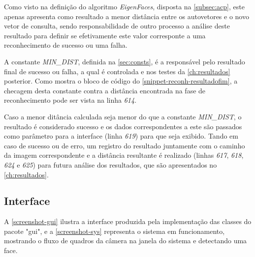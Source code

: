 Como visto na definição do algoritmo \textit{EigenFaces}, disposta na \autoref{subsec:acp}, este apenas apresenta como resultado a menor distância entre os autovetores e o novo vetor de consulta, sendo responsabilidade de outro processo a análise deste resultado para definir se efetivamente este valor corresponte a uma reconhecimento de sucesso ou uma falha.

A constante \textit{MIN\_DIST}, definida na \autoref{sec:consts}, é a responsável pelo resultado final de sucesso ou falha, a qual é controlada e nos testes da \autoref{ch:resultados} posterior. Como mostra o bloco de código do \autoref{snippet-reconh-resultadofim}, a checagem desta constante contra a distância encontrada na fase de reconhecimento pode ser vista na linha \textit{614}.



\codigoJava



Caso a menor ditância calculada seja menor do que a constante \textit{MIN\_DIST}, o resultado é considerado sucesso e os dados correspondentes a este são passados como parâmetro para a interface (linha \textit{619}) para que seja exibido. Tando em caso de sucesso ou de erro, um registro do resultado juntamente com o caminho da imagem correspondente e a distância resultante é realizado (linhas \textit{617}, \textit{618}, \textit{624} e \textit{625}) para futura análise dos resultados, que são apresentados no  \autoref{ch:resultados}.


\subsection{Interface}\label{sec:interface}


A \autoref{screenshot-gui} ilustra a interface produzida pela implementação das classes do pacote "gui", e a \autoref{screenshot-sys} representa o sistema em funcionamento, mostrando o fluxo de quadros da câmera na janela do sistema e detectando uma face.

